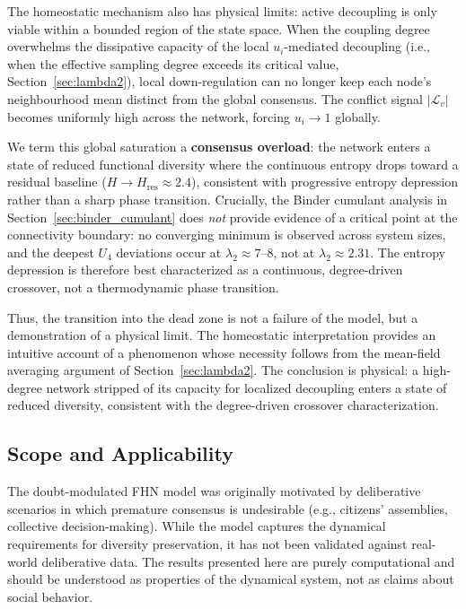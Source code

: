 ﻿\documentclass[11pt]{article}
\begin{document}
The homeostatic mechanism also has physical limits: active decoupling is only viable within a bounded region of the state space. When the coupling degree overwhelms the dissipative capacity of the local $u_i$-mediated decoupling (i.e., when the effective sampling degree exceeds its critical value, Section~\ref{sec:lambda2}), local down-regulation can no longer keep each node's neighbourhood mean distinct from the global consensus. The conflict signal $|\mathcal{L}_v|$ becomes uniformly high across the network, forcing $u_i \to 1$ globally.

We term this global saturation a \textbf{consensus overload}: the network enters a state of reduced functional diversity where the continuous entropy drops toward a residual baseline ($H \to H_{\mathrm{res}} \approx 2.4$), consistent with progressive entropy depression rather than a sharp phase transition. Crucially, the Binder cumulant analysis in Section~\ref{sec:binder_cumulant} does \emph{not} provide evidence of a critical point at the connectivity boundary: no converging minimum is observed across system sizes, and the deepest $U_4$ deviations occur at $\lambda_2 \approx 7$--$8$, not at $\lambda_2 \approx 2.31$. The entropy depression is therefore best characterized as a continuous, degree-driven crossover, not a thermodynamic phase transition.

Thus, the transition into the dead zone is not a failure of the model, but a demonstration of a physical limit. The homeostatic interpretation provides an intuitive account of a phenomenon whose necessity follows from the mean-field averaging argument of Section~\ref{sec:lambda2}. The conclusion is physical: a high-degree network stripped of its capacity for localized decoupling enters a state of reduced diversity, consistent with the degree-driven crossover characterization.



\subsection{Scope and Applicability}

The doubt-modulated FHN model was originally motivated by deliberative scenarios in which premature consensus is undesirable (e.g., citizens' assemblies, collective decision-making). While the model captures the dynamical requirements for diversity preservation, it has not been validated against real-world deliberative data. The results presented here are purely computational and should be understood as properties of the dynamical system, not as claims about social behavior.
\end{document}
